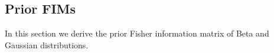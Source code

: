 \subsection{Prior FIMs}\label{apx:prior_fim}
In this section we derive the prior Fisher information matrix of Beta and Gaussian distributions.
